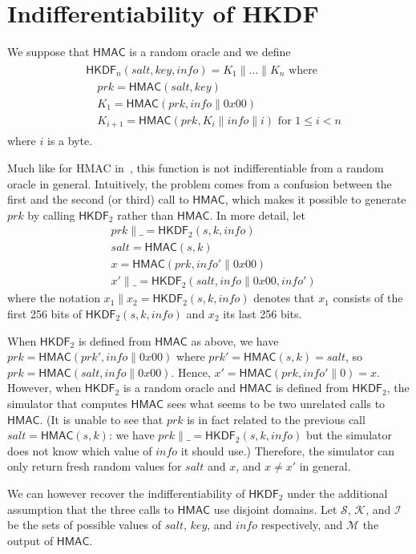 \documentclass[compsoc, conference, letterpaper, 10pt, times]{IEEEtran}
\newcommand{\HKDF}{\mathsf{HKDF}}
\newcommand{\hkdftwo}{\HKDF_2}
\newcommand{\salt}{\mathit{salt}}
\newcommand{\key}{\mathit{key}}
\newcommand{\info}{\mathit{info}}
\newcommand{\prk}{\mathit{prk}}
\newcommand{\hmac}{\mathsf{HMAC}}
\newcommand{\Ssalt}{\mathcal{S}}
\newcommand{\Skey}{\mathcal{K}}
\newcommand{\Sinfo}{\mathcal{I}}
\newcommand{\Smac}{\mathcal{M}}
\begin{document}
\section{Indifferentiability of HKDF}

We suppose that $\hmac$ is a random oracle and we define
\begin{align*}
\begin{split}
&\HKDF_n(\salt,\key,\info) = K_1 \| \dots \| K_n \text{ where}\\
&\quad \prk = \hmac(\salt,\key)\\
&\quad K_1 = \hmac(\prk, \info \| 0x00)\\
&\quad K_{i+1} = \hmac(\prk, K_i \| \info \| i) \text{ for }1 \leq i < n
\end{split}
\end{align*}
where $i$ is a byte.

Much like for HMAC in~\cite{Dodis12}, this function is not indifferentiable from a random oracle in general. Intuitively, the problem comes from a confusion between the first and the second (or third) call to $\hmac$, which makes it possible to generate $\prk$ by calling $\hkdftwo$ rather than $\hmac$. In more detail, let
\begin{align*}
&\prk \|\_ = \hkdftwo(s,k,\info)\\
&\salt = \hmac(s,k)\\
&x = \hmac(\prk,\info'\|0x00)\\
&x' \|\_ = \hkdftwo(\salt,\info\|0x00,\info')
\end{align*}
where the notation $x_1 \|x_2 = \hkdftwo(s,k,\info)$
denotes that $x_1$ consists of the first 256 bits of $\hkdftwo(s,k,\info)$ 
and $x_2$ its last 256 bits.

When $\hkdftwo$ is defined from $\hmac$ as above, we have 
$\prk = \hmac(\prk', \info\|0x00)$ where $\prk' = \hmac(s,k) = \salt$,
so $\prk = \hmac(\salt,\info\|0x00)$. Hence, $x' = \hmac(\prk,\info'\|0) = x$.
However, when $\hkdftwo$ is a random oracle and $\hmac$ is defined
from $\hkdftwo$, the simulator that computes $\hmac$ sees what seems
to be two unrelated calls to $\hmac$. (It is unable to see that $\prk$
is in fact related to the previous call $\salt = \hmac(s,k)$: we have 
$\prk \|\_ = \hkdftwo(s,k,\info)$ but the simulator does not know which value
of $\info$ it should use.) Therefore, the simulator can only return fresh random
values for $\salt$ and $x$, and $x \neq x'$ in general.

We can however recover the indifferentiability of $\hkdftwo$ under the 
additional assumption that the three calls to $\hmac$ use disjoint domains.
Let $\Ssalt$, $\Skey$, and $\Sinfo$ be the sets of possible values of $\salt$, 
$\key$, and $\info$ respectively, and $\Smac$ the output of $\hmac$.
\end{document}
